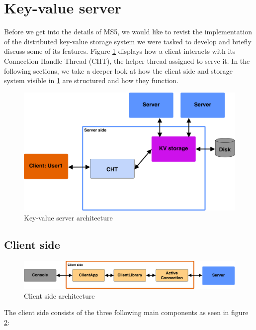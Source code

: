 \section{Key-value server}
 Before we get into the details of MS5, we would like to revist the implementation of the distributed key-value storage system we were tasked to develop and briefly discuss some of its features. Figure \ref{fig:ms4_arch} displays how a client interacts with its Connection Handle Thread (CHT), the helper thread assigned to serve it. In the following sections, we take a deeper look at how the client side and storage system visible in \ref{fig:ms4_arch} are structured and how they function.

\begin{figure}[h]
	\centering
	\includegraphics[width=\linewidth]{figures/kvserver/ms4_structure.png}
	\caption{Key-value server architecture}
	\label{fig:ms4_arch}
\end{figure}



\subsection{Client side}

\begin{figure}[h]
	\centering
	\includegraphics[width=\linewidth]{figures/kvserver/client_arch.png}
	\caption{Client side architecture}
	\label{fig:client_arch}
\end{figure}

The client side consists of the three following main components as seen in figure \ref{fig:client_arch}:

